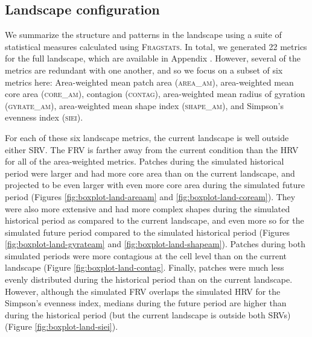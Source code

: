 \documentclass[12pt]{article}
\begin{document}
\begin{spacing}{1}
\subsection*{Landscape configuration}
We summarize the structure and patterns in the landscape using a suite of statistical measures calculated using \textsc{Fragstats}. In total, we generated 22 metrics for the full landscape, which are available in Appendix . However, several of the metrics are redundant with one another, and so we focus on a subset of six metrics here: Area-weighted mean patch area (\textsc{area\_am}), area-weighted mean core area (\textsc{core\_am}), contagion (\textsc{contag}), area-weighted mean radius of gyration (\textsc{gyrate\_am}), area-weighted mean shape index (\textsc{shape\_am}), and Simpson's evenness index (\textsc{siei}). 

For each of these six landscape metrics, the current landscape is well outside either SRV. The FRV is farther away from the current condition than the HRV for all of the area-weighted metrics. Patches during the simulated historical period were larger and had more core area than on the current landscape, and projected to be even larger with even more core area during the simulated future period (Figures \ref{fig:boxplot-land-areaam} and \ref{fig:boxplot-land-coream}). They were also more extensive and had more complex shapes during the simulated historical period as compared to the current landscape, and even more so for the simulated future period compared to the simulated historical period (Figures \ref{fig:boxplot-land-gyrateam} and \ref{fig:boxplot-land-shapeam}). Patches during both simulated periods were more contagious at the cell level than on the current landscape (Figure \ref{fig:boxplot-land-contag}. Finally, patches were much less evenly distributed during the historical period than on the current landscape. However, although the simulated FRV overlaps the simulated HRV for the Simpson's evenness index, medians during the future period are higher than during the historical period (but the current landscape is outside both SRVs) (Figure \ref{fig:boxplot-land-siei}). 


\end{spacing}
\end{document}
